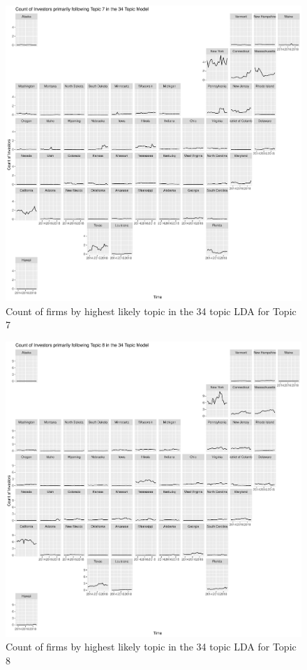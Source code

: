		\begin{figure}
		\centering
		\includegraphics[width=1\linewidth]{Figures/ChapterV/USA_34_Topic07.pdf}
		\caption[Count of firm for Topic 7 by quarter]{Count of firms by highest likely topic in the 34 topic LDA for Topic 7}
		\label{fig:StateLDA7}
	\end{figure}
	
		\begin{figure}
		\centering
		\includegraphics[width=1\linewidth]{Figures/ChapterV/USA_34_Topic08.pdf}
		\caption[Count of firm for Topic 8 by quarter]{Count of firms by highest likely topic in the 34 topic LDA for Topic 8}
		\label{fig:StateLDA8}
	\end{figure}
	
